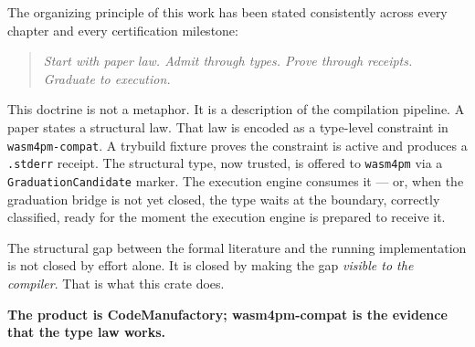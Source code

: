 The organizing principle of this work has been stated consistently across every
chapter and every certification milestone:

\begin{quote}
\emph{Start with paper law. Admit through types. Prove through receipts.
Graduate to execution.}
\end{quote}

This doctrine is not a metaphor. It is a description of the compilation
pipeline. A paper states a structural law. That law is encoded as a type-level
constraint in \texttt{wasm4pm-compat}. A trybuild fixture proves the constraint
is active and produces a \texttt{.stderr} receipt. The structural type, now
trusted, is offered to \texttt{wasm4pm} via a \texttt{GraduationCandidate}
marker. The execution engine consumes it --- or, when the graduation bridge is
not yet closed, the type waits at the boundary, correctly classified, ready
for the moment the execution engine is prepared to receive it.

The structural gap between the formal literature and the running implementation
is not closed by effort alone. It is closed by making the gap \emph{visible to
the compiler}. That is what this crate does.

\bigskip
\noindent\textbf{The product is CodeManufactory; wasm4pm-compat is the
evidence that the type law works.}
